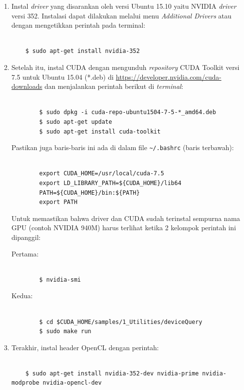 \begin{enumerate}
	\item Instal \textit{driver} yang disarankan oleh versi Ubuntu 15.10 yaitu NVIDIA \textit{driver} versi 352. Instalasi dapat dilakukan melalui menu \textit{Additional Drivers} atau dengan mengetikkan perintah pada terminal:
	
	\begin{lstlisting}
		
	$ sudo apt-get install nvidia-352
	\end{lstlisting}
	
	\item Setelah itu, instal CUDA dengan mengunduh \textit{repository} CUDA Toolkit versi 7.5 untuk Ubuntu 15.04 (*.deb) di \url{https://developer.nvidia.com/cuda-downloads} dan menjalankan perintah berikut di \textit{terminal}:  
	
	\begin{lstlisting}
	
		$ sudo dpkg -i cuda-repo-ubuntu1504-7-5-*_amd64.deb
		$ sudo apt-get update
		$ sudo apt-get install cuda-toolkit
	\end{lstlisting}
	Pastikan juga baris-baris ini ada di dalam file \verb|~/.bashrc| (baris terbawah):
	
	\begin{lstlisting}
	
		export CUDA_HOME=/usr/local/cuda-7.5 
		export LD_LIBRARY_PATH=${CUDA_HOME}/lib64 
		PATH=${CUDA_HOME}/bin:${PATH} 
		export PATH	
	\end{lstlisting}
	
	Untuk memastikan bahwa driver dan CUDA sudah terinstal sempurna nama GPU (contoh NVIDIA 940M) harus terlihat ketika 2 kelompok perintah ini dipanggil:
	
	Pertama:
	
	\begin{lstlisting}
	
		$ nvidia-smi
	\end{lstlisting}
	
	Kedua:
	
	\begin{lstlisting}
	
		$ cd $CUDA_HOME/samples/1_Utilities/deviceQuery
		$ sudo make run		
	\end{lstlisting}
	
	\item Terakhir, instal header OpenCL dengan perintah:
	
	\begin{lstlisting}
	
	$ sudo apt-get install nvidia-352-dev nvidia-prime nvidia-modprobe nvidia-opencl-dev
	\end{lstlisting}
	
\end{enumerate}

